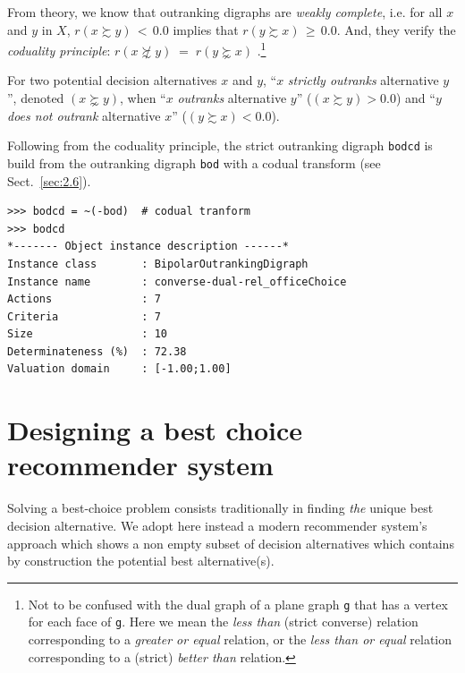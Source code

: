 From theory, we know that outranking digraphs are \emph{weakly complete}, i.e. for all $x$ and $y$ in $X$, $r(x \succsim y)\, <\, 0.0$ implies that $r(y \succsim x)\, \geqslant \, 0.0$. And, they verify the \emph{coduality principle}:  $r(x \not\succsim y) \; = \; r(y \succnsim x)$ \citep{BIS-2013}.\footnote{Not to be confused with the dual graph of a plane graph \texttt{g} that has a vertex for each face of \texttt{g}. Here we mean the \emph{less than} (strict converse) relation corresponding to a \emph{greater or equal} relation, or the \emph{less than or equal} relation corresponding to a (strict) \emph{better than} relation.}

\begin{definition}\label{def:strictOutranking}

\noindent For two potential decision alternatives $x$ and $y$, ``$x$ \emph{strictly outranks} alternative $y$'', denoted $(x \succnsim y)$, when ``$x$ \emph{outranks} alternative $y$'' ($(x \succsim y) > 0.0$) and ``$y$ \emph{does not outrank} alternative $x$'' ($(y \succsim x) < 0.0$).
\end{definition}

Following from the coduality principle, the strict outranking digraph \texttt{bodcd} is build from the outranking digraph \texttt{bod} with a codual transform (see Sect.~\ref{sec:2.6}).
\begin{lstlisting} 
>>> bodcd = ~(-bod)  # codual tranform
>>> bodcd
*------- Object instance description ------*
Instance class       : BipolarOutrankingDigraph
Instance name        : converse-dual-rel_officeChoice
Actions              : 7
Criteria             : 7
Size                 : 10
Determinateness (%)  : 72.38
Valuation domain     : [-1.00;1.00]
\end{lstlisting}


\section{Designing a best choice recommender system}
\label{sec:4.4}

Solving a best-choice problem consists traditionally in finding \emph{the} unique best decision alternative. We adopt here instead a modern recommender system’s approach which shows a non empty subset of decision alternatives which contains by construction the potential best alternative(s).

